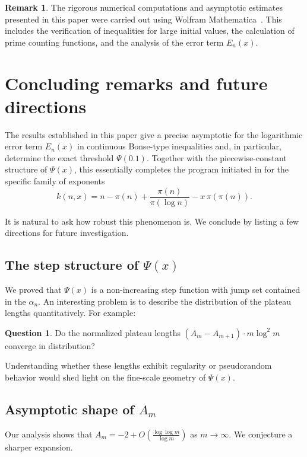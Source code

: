 \documentclass[10pt]{amsart}
\theoremstyle{definition} %
\newtheorem{question}{Question}
\newtheorem{remark}{Remark}[section]
\numberwithin{equation}{section}
\begin{document}
\begin{remark}
    The rigorous numerical computations and asymptotic estimates presented in this paper were carried out using \textsf{Wolfram Mathematica}~{}\cite{wolfram2023}. This includes the verification of inequalities for large initial values, the calculation of prime counting functions, and the analysis of the error term $E_n(x)$.
\end{remark}

\section{Concluding remarks and future directions}\label{conclude}

The results established in this paper give a precise asymptotic for the logarithmic
error term $E_n(x)$ in continuous Bonse-type inequalities and, in particular,
determine the exact threshold $\Psi(0.1)$. Together with the piecewise-constant
structure of $\Psi(x)$, this essentially completes the program initiated in
\cite{papa, bonse, mt1} for the specific family of exponents
\[
k(n,x)=n-\pi(n)+\frac{\pi(n)}{\pi(\log n)}-x\,\pi(\pi(n)).
\]

It is natural to ask how robust this phenomenon is. We conclude by listing a
few directions for future investigation.

\subsection*{The step structure of $\Psi(x)$}

We proved that $\Psi(x)$ is a non-increasing step function with jump set contained in the
$\alpha_n$. An interesting problem is to describe the distribution of the plateau lengths
quantitatively. For example:

\begin{question}
Do the normalized plateau lengths $(A_m-A_{m+1})\cdot m\log^2 m$ converge in distribution?
\end{question}

Understanding whether these lengths exhibit regularity or pseudorandom behavior would
shed light on the fine-scale geometry of $\Psi(x)$.

\subsection*{Asymptotic shape of $A_m$}

Our analysis shows that $A_m=-2+O(\tfrac{\log\log m}{\log m})$ as $m\to\infty$.
We conjecture a sharper expansion.
\end{document}
